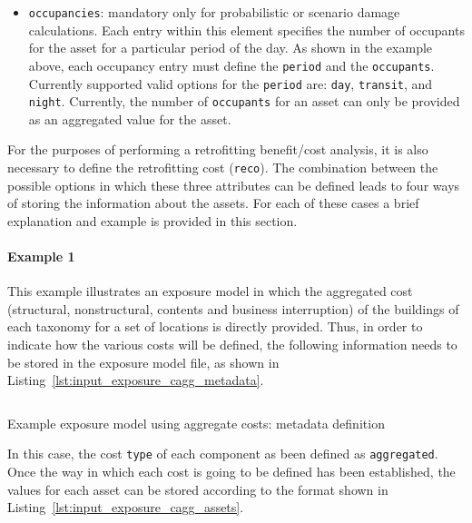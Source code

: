 \begin{itemize}
  \item \Verb+occupancies+: mandatory only for probabilistic or scenario 
    damage calculations. Each entry within this element specifies the number of
    occupants for the asset for a particular period of the day. As shown in 
    the example above, each occupancy entry must define the \Verb+period+ and 
    the \Verb+occupants+. Currently supported valid options for the 
    \Verb+period+ are: \Verb+day+, \Verb+transit+, and \Verb+night+. Currently,
    the number of \Verb+occupants+ for an asset can only be provided as an 
    aggregated value for the asset.

\end{itemize}

For the purposes of performing a retrofitting benefit/cost analysis, it
is also necessary to define the retrofitting cost (\Verb+reco+). The
combination between the possible options in which these three attributes can
be defined leads to four ways of storing the information about the assets. For
each of these cases a brief explanation and example is provided in this
section.


\paragraph{Example 1}

This example illustrates an \gls{exposure model} in which the aggregated cost
(structural, nonstructural, contents and business interruption) of the
buildings of each taxonomy for a set of locations is directly provided. Thus,
in order to indicate how the various costs will be defined, the following
information needs to be stored in the exposure model file, as shown in
Listing~\ref{lst:input_exposure_cagg_metadata}.

\begin{listing}[htbp]
  \inputminted[firstline=8,firstnumber=8,lastline=18,fontsize=\footnotesize,frame=single,linenos,bgcolor=lightgray]{xml}{oqum/risk/Verbatim/input_exposure_cagg.xml}
  \caption{Example exposure model using aggregate costs: metadata definition}
  \label{lst:input_exposure_cagg_metadata}
\end{listing}

In this case, the cost \Verb+type+ of each component as been defined as
\Verb+aggregated+. Once the way in which each cost is going to be defined has
been established, the values for each asset can be stored according to the
format shown in Listing~\ref{lst:input_exposure_cagg_assets}.

